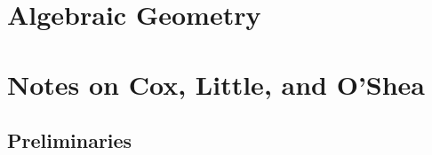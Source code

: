\documentclass[crop=false,class=article,oneside]{standalone}
\begin{document}
    \ifx\ifmathcoursesalgebraicgeometry\undefined
        \section*{Algebraic Geometry}
        \setcounter{section}{1}
        \renewcommand\thefigure{\arabic{section}.\arabic{figure}}
        \renewcommand\thesubfigure{%
            \arabic{section}.\arabic{figure}.\arabic{subfigure}}
    \else
        \section{Notes on Cox, Little, and O'Shea}
    \fi
    \subsection{Preliminaries}
\end{document}
